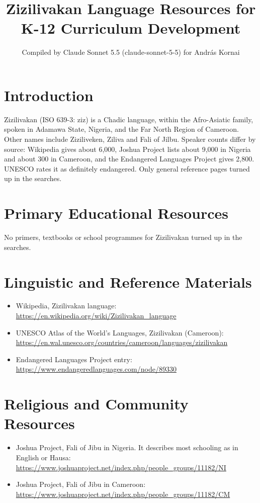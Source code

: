 \documentclass[12pt]{article}
\title{Zizilivakan Language Resources for K-12 Curriculum Development}
\author{Compiled by Claude Sonnet 5.5 (claude-sonnet-5-5) for Andr\'as Kornai}
\date{}
\begin{document}
\maketitle

\section{Introduction}
Zizilivakan (ISO 639-3: ziz) is a Chadic language, within the Afro-Asiatic family, spoken in Adamawa State, Nigeria, and the Far North Region of Cameroon. Other names include Ziziliveken, Ziliva and Fali of Jilbu. Speaker counts differ by source: Wikipedia gives about 6,000, Joshua Project lists about 9,000 in Nigeria and about 300 in Cameroon, and the Endangered Languages Project gives 2,800. UNESCO rates it as definitely endangered. Only general reference pages turned up in the searches.

\section{Primary Educational Resources}
No primers, textbooks or school programmes for Zizilivakan turned up in the searches.

\section{Linguistic and Reference Materials}
\begin{itemize}
\item Wikipedia, Zizilivakan language: \url{https://en.wikipedia.org/wiki/Zizilivakan_language}
\item UNESCO Atlas of the World's Languages, Zizilivakan (Cameroon): \url{https://en.wal.unesco.org/countries/cameroon/languages/zizilivakan}
\item Endangered Languages Project entry: \url{https://www.endangeredlanguages.com/node/89330}
\end{itemize}

\section{Religious and Community Resources}
\begin{itemize}
\item Joshua Project, Fali of Jibu in Nigeria. It describes most schooling as in English or Hausa: \url{https://www.joshuaproject.net/index.php/people_groups/11182/NI}
\item Joshua Project, Fali of Jibu in Cameroon: \url{https://www.joshuaproject.net/index.php/people_groups/11182/CM}
\end{itemize}
\end{document}
